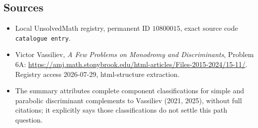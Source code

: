 \documentclass[11pt]{article}
\begin{document}
\subsection{Sources}
\begin{itemize}
\item Local UnsolvedMath registry, permanent ID \(10800015\), exact source code \texttt{catalogue entry}.
\item Victor Vassiliev, \emph{A Few Problems on Monodromy and Discriminants}, Problem 6A: \url{https://amj.math.stonybrook.edu/html-articles/Files-2015-2024/15-11/}. Registry access 2026-07-29, html-structure extraction.
\item The summary attributes complete component classifications for simple and parabolic discriminant complements to Vassiliev (2021, 2025), without full citations; it explicitly says those classifications do not settle this path question.
\end{itemize}
\end{document}
